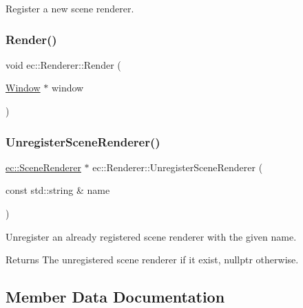 Register a new scene renderer. \mbox{\label{classec_1_1_renderer_afe11d20b1d49004bb01bb5db31845803}} 
\subsubsection{\texorpdfstring{Render()}{Render()}}
{\footnotesize\ttfamily void ec\+::\+Renderer\+::\+Render (\begin{DoxyParamCaption}\item[{\mbox{\hyperlink{classec_1_1_window}{Window}} $\ast$}]{window }\end{DoxyParamCaption})}

\mbox{\label{classec_1_1_renderer_ac5063a2c741004706dfe6dc143f8168f}} 
\subsubsection{\texorpdfstring{Unregister\+Scene\+Renderer()}{UnregisterSceneRenderer()}}
{\footnotesize\ttfamily \mbox{\hyperlink{classec_1_1_scene_renderer}{ec\+::\+Scene\+Renderer}} $\ast$ ec\+::\+Renderer\+::\+Unregister\+Scene\+Renderer (\begin{DoxyParamCaption}\item[{const std\+::string \&}]{name }\end{DoxyParamCaption})}

Unregister an already registered scene renderer with the given name. \begin{DoxyReturn}{Returns}
The unregistered scene renderer if it exist, nullptr otherwise. 
\end{DoxyReturn}


\subsection{Member Data Documentation}
\mbox{\label{classec_1_1_renderer_a00afed952025d62a654a5f961a55b342}} 
